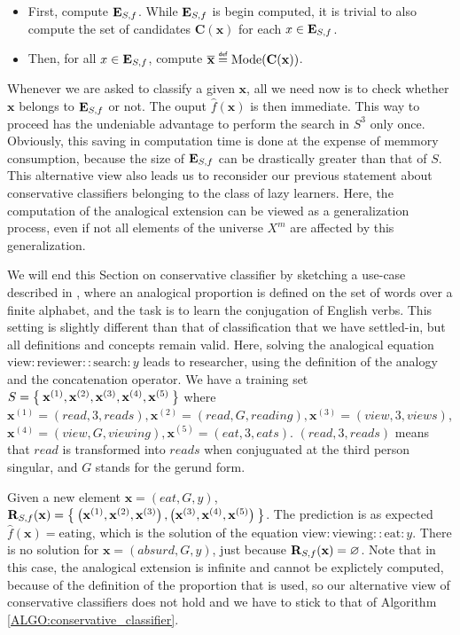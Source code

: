 \begin{itemize}
\item First, compute $\mathbf{E}_{S,f}$. While $\mathbf{E}_{S,f}$ is begin computed, it is trivial to
  also compute the set of candidates $\mathbf{C}(\mathbf{x})$ for each $x \in
    \mathbf{E}_{S,f}$.
  \item Then, for all $x \in\mathbf{E}_{S,f}$, compute
    $\albl{\mathbf{x}} \eqdef \text{Mode}(\mathbf{C}(\mathbf{x}))$.
\end{itemize}
\noindent
Whenever we are asked to classify a given $\mathbf{x}$, all we need now is to
check whether $\mathbf{x}$ belongs to $\mathbf{E}_{S,f}$ or not. The ouput
$\hat{f}(\mathbf{x})$ is then immediate. This way to proceed has the undeniable
advantage to perform the search in $S^3$ only once. Obviously, this saving in
computation time is done at the expense of memmory consumption, because the
size of $\mathbf{E}_{S,f}$ can be drastically greater than that of $S$. This alternative
view also leads us to reconsider our previous statement about conservative
classifiers belonging to the class of lazy learners. Here, the computation of
the analogical extension can be viewed as a generalization process, even if not
all elements of the universe $X^m$ are affected by this generalization.

We will end this Section on conservative classifier by sketching a use-case
described in \cite{StrYvoREPORT05}, where an analogical proportion is defined
on the set of words over a finite alphabet, and the task is to learn the
conjugation of English verbs. This setting is slightly different than that of
classification that we have settled-in, but all definitions and concepts remain
valid. Here, solving the analogical equation
$\text{view}:\text{reviewer}::\text{search}:y$ leads to $\text{researcher}$,
using the definition of the analogy and the concatenation operator. 
We have a training set $S=\Set{\mathbf{x}^{(1)},\mathbf{x}^{(2)},
\mathbf{x}^{(3)}, \mathbf{x}^{(4)}, \mathbf{x}^{(5)}}$ where
$\mathbf{x}^{(1)}=(read,3,reads), \mathbf{x}^{(2)}=(read,G,reading),
\mathbf{x}^{(3)}=(view,3,views)$, $\mathbf{x}^{(4)}=(view,G,viewing),
\mathbf{x}^{(5)}=(eat,3,eats)$. $(read,3,reads)$ means that $read$ is
transformed into $reads$ when conjuguated at the third person singular, and $G$
stands for the gerund form.

Given a new element $\mathbf{x}=(eat,G,y)$, $\mathbf{R}_{S,f}(\mathbf{x})=
\Set{\left(\mathbf{x}^{(1)}, \mathbf{x}^{(2)}, \mathbf{x}^{(3)}\right),
\left(\mathbf{x}^{(3)},\mathbf{x}^{(4)},\mathbf{x}^{(5)}\right)}$. The
prediction is as expected $\hat{f}(\mathbf{x})=\text{eating}$, which is the
solution of the equation $\text{view}:\text{viewing}::\text{eat}:y$. There is
no solution for $\mathbf{x}=(absurd,G,y)$, just because $\mathbf{R}_{S,f}(\mathbf{x})= \varnothing$.
Note that in this case, the analogical extension is infinite and cannot be
explictely computed, because of the definition of the proportion that is used,
so our alternative view of conservative classifiers does not hold and we have
to stick to that of Algorithm \ref{ALGO:conservative_classifier}.

